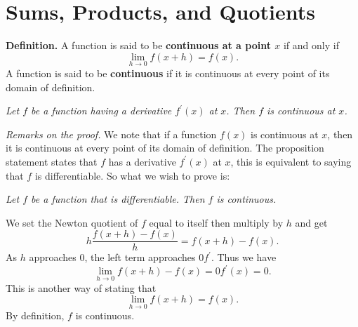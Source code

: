 \section*{Sums, Products, and Quotients}

\textbf{Definition.} A function is said to be \textbf{continuous at a point $x$} if and only if
\[\lim_{h\to0} f(x + h) = f(x).\]
A function is said to be \textbf{continuous} if it is continuous at every point of its domain of definition.

\begin{center}
\textit{Let $f$ be a function having a derivative $f^\prime(x)$ at $x$. Then $f$ is continuous at $x$.}
\end{center}

\textit{Remarks on the proof.}
We note that if a function $f(x)$ is continuous at $x$, then it is continuous at every point of its domain of
definition.
The proposition statement states that $f$ has a derivative $f^\prime(x)$ at $x$, this is equivalent to saying that
$f$ is differentiable. So what we wish to prove is:

\begin{center}
\textit{Let $f$ be a function that is differentiable. Then $f$ is continuous.}
\end{center}

We set the Newton quotient of $f$ equal to itself then multiply by $h$ and get
\[h \frac{f(x + h) - f(x)}{h} = f(x + h) - f(x).\]
As $h$ approaches 0, the left term approaches $0f^\prime$. Thus we have
\[\lim_{h\to0} f(x + h) - f(x) = 0f^\prime(x) = 0.\]
This is another way of stating that
\[\lim_{h\to0} f(x + h) = f(x).\]
By definition, $f$ is continuous.
